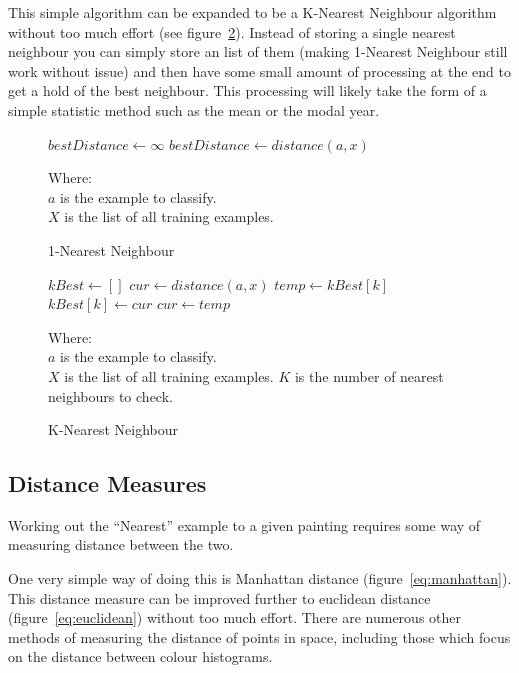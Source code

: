 \documentclass[11pt,fleqn,twoside]{article}
\begin{document}
This simple algorithm can be expanded to be a K-Nearest Neighbour algorithm without too much effort
(see figure~\ref{fig:k-nn}). Instead of storing a single nearest neighbour you can simply store an
list of them (making 1-Nearest Neighbour still work without issue) and then have some small amount
of processing at the end to get a hold of the best neighbour. This processing will likely take the
form of a simple statistic method such as the mean or the modal year.

\begin{figure}[h]
\begin{algorithmic}
\State $bestDistance \gets \infty$
		\State $bestDistance \gets distance(a, x)$
	\EndIf
\EndFor
\end{algorithmic}

Where:\\
\(a\) is the example to classify.\\
\(X\) is the list of all training examples.
\caption{1-Nearest Neighbour}
\label{fig:1-nn}
\end{figure}

\begin{figure}[h]
\begin{algorithmic}
\State $kBest \gets []$
	\State $cur \gets distance(a, x)$
			\State $temp \gets kBest[k]$
			\State $kBest[k] \gets cur$
			\State $cur \gets temp$
		\EndIf
	\EndFor
\EndFor
\end{algorithmic}
Where:\\
$a$ is the example to classify.\\
$X$ is the list of all training examples.
$K$ is the number of nearest neighbours to check.
\caption{K-Nearest Neighbour}
\label{fig:k-nn}
\end{figure}


\subsection{Distance Measures}
Working out the ``Nearest'' example to a given painting requires some way of measuring distance
between the two.

One very simple way of doing this is Manhattan distance (figure~\ref{eq:manhattan}). This distance
measure can be improved further to euclidean distance (figure~\ref{eq:euclidean}) without too much
effort. There are numerous other methods of measuring the distance of points in space, including
those which focus on the distance between colour histograms.
\end{document}
